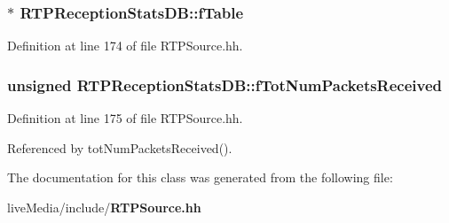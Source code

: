 \subsubsection[{f\+Table}]{$\ast$ R\+T\+P\+Reception\+Stats\+D\+B\+::f\+Table\hspace{0.3cm}{\ttfamily [private]}}\label{classRTPReceptionStatsDB_a017b4f6282fb91f69ff3ef6291e4bc36}


Definition at line 174 of file R\+T\+P\+Source.\+hh.

\subsubsection[{f\+Tot\+Num\+Packets\+Received}]{\setlength{\rightskip}{0pt plus 5cm}unsigned R\+T\+P\+Reception\+Stats\+D\+B\+::f\+Tot\+Num\+Packets\+Received\hspace{0.3cm}{\ttfamily [private]}}\label{classRTPReceptionStatsDB_a97672eb7efa35d7210cee1c072e2ccdd}


Definition at line 175 of file R\+T\+P\+Source.\+hh.



Referenced by tot\+Num\+Packets\+Received().



The documentation for this class was generated from the following file\+:\begin{DoxyCompactItemize}
\item 
live\+Media/include/{\bf R\+T\+P\+Source.\+hh}\end{DoxyCompactItemize}
